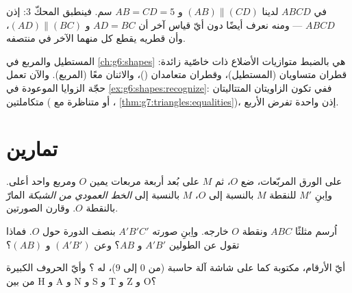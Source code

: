 \begin{example}\label{ex:g7:central:recognize}
في $ABCD$ لدينا $(AB) \parallel (CD)$ و $AB = CD = 5$ سم. فينطبق المحكّ 3:
إذن $ABCD$  --- ومنه نعرف أيضًا دون أيّ
قياس آخر أن $AD = BC$ و $(AD) \parallel (BC)$، وأن
قطريه يقطع كل منهما الآخر في منتصفه.
\end{example}

\begin{remark}
المستطيل  والمربع في \cref{ch:g6:shapes} هي بالضبط
متوازيات الأضلاع ذات خاصّية زائدة: قطران متساويان
(المستطيل)، وقطران متعامدان ()، والاثنان معًا (المربع). والآن
تعمل حجّة الزوايا الموعودة في \cref{ex:g6:shapes:recognize}:
ففي  تكون الزاويتان المتتاليتان متكاملتين
( أو متناظرة مع ،
\cref{thm:g7:triangles:equalities})، إذن  واحدة تفرض
الأربع.
\end{remark}

\section{تمارين}

\begin{exercise}[$\star$]\label{exo:g7:central:1}
على الورق المربّعات، ضع $O$، ثم $M$ على بُعد أربعة مربعات يمين $O$ ومربع
واحد أعلى. واِبنِ  $M'$ للنقطة $M$ بالنسبة إلى $O$، 
$M$ بالنسبة إلى \emph{الخط العمودي من الشبكة} المارّ بالنقطة $O$.
وقارن الصورتين.
\end{exercise}

\begin{exercise}[$\star$]\label{exo:g7:central:2}
اُرسم مثلثًا $ABC$ ونقطة $O$ خارجه. واِبنِ صورته
$A'B'C'$ بنصف الدورة حول $O$. فماذا تقول عن
الطولين $A'B'$ و $AB$؟ وعن  $(A'B')$ و $(AB)$؟
\end{exercise}

\begin{exercise}[$\star$]\label{exo:g7:central:3}
أيّ الأرقام، مكتوبة كما على شاشة آلة حاسبة (من $0$ إلى $9$)، له
؟ وأيّ الحروف الكبيرة من بين H و A و N و S و T و Z و O؟
\end{exercise}

